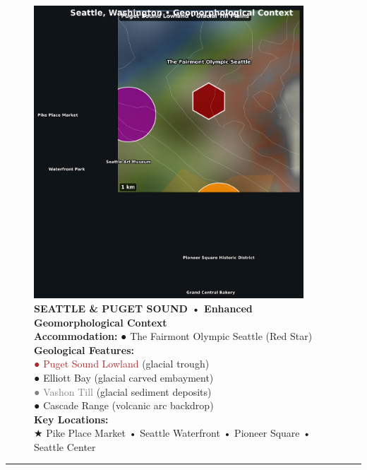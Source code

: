 \documentclass[
  11pt,
]{article}
\begin{document}
\begin{figure}[H]
\centering
\includegraphics[width=0.9\textwidth]{images/seattle_wa_geomorphological_map.png}
\caption{\textbf{\textcolor{primary}{SEATTLE \& PUGET SOUND • Enhanced Geomorphological Context}} \\ 
\textbf{\textcolor{secondary}{Accommodation:}} \textcolor{mapred}{●} The Fairmont Olympic Seattle (Red Star) \\
\textbf{\textcolor{secondary}{Geological Features:}} \\
\textcolor{brown}{●} \textcolor{brown}{Puget Sound Lowland} (glacial trough) \\
\textcolor{mapblue}{●} \textcolor{mapblue}{Elliott Bay} (glacial carved embayment) \\
\textcolor{gray}{●} \textcolor{gray}{Vashon Till} (glacial sediment deposits) \\
\textcolor{mapgreen}{●} \textcolor{mapgreen}{Cascade Range} (volcanic arc backdrop) \\
\textbf{\textcolor{secondary}{Key Locations:}} \\
\textcolor{mapred}{★} Pike Place Market • Seattle Waterfront • Pioneer Square • Seattle Center}
\end{figure}

\begin{center}\rule{0.5\linewidth}{0.5pt}\end{center}
\end{document}
